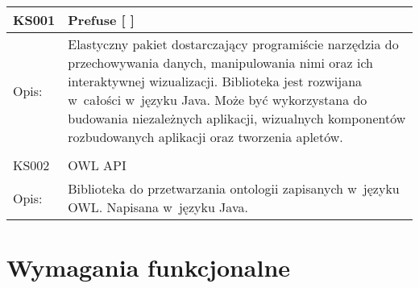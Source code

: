\begin{center}
\begin{longtable}{|m{3cm}|m{9cm}|} \hline

KS001 & Prefuse [\cite{prefuse} \cite{prefuse_sdj}]\\ \hline
Opis: &  
 Elastyczny pakiet dostarczający programiście narzędzia do przechowywania danych, manipulowania nimi oraz ich interaktywnej wizualizacji.
 Biblioteka jest rozwijana w~całości w~języku Java. Może być wykorzystana do budowania niezależnych aplikacji, wizualnych komponentów rozbudowanych 
aplikacji oraz tworzenia apletów.
\\ \hline

\multicolumn{2}{c}{} \\
 \hline

KS002 & OWL API \\ \hline
Opis: &  Biblioteka do przetwarzania ontologii zapisanych w~języku OWL. Napisana w~języku Java.\\ \hline


\end{longtable}
\end{center}

\section{Wymagania funkcjonalne}


